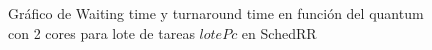 \begin{figure}[H]
\hfill
{}
\hfill
{}
\hfill
\caption{Gráfico de Waiting time y turnaround time en función del quantum con 2 cores para lote de tareas $lotePc$ en SchedRR}
\end{figure}

